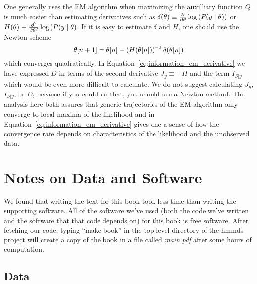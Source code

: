 One generally uses the EM algorithm when maximizing the auxilliary
function $Q$ is much easier than estimating derivatives such as
$\delta(\theta) \equiv \frac{\partial}{\partial \theta} \log
\left( P(y \mid \theta )\right)$ or
$H(\theta) \equiv \frac{\partial^2}{\partial \theta^2} \log
\left( P(y \mid \theta \right)$.  If it is easy to estimate
$\delta$ and $H$, one should use the Newton scheme
\begin{equation*}
  {\theta}{[n+1]} = {\theta}{[n]} - \left(H({\theta}{[n]})\right)^{-1} \delta({\theta}{[n]})
\end{equation*}
which converges quadratically.  In
Equation~\eqref{eq:information_em_derivative} we have expressed $D$ in
terms of the second derivative $J_y\equiv -H$ and the term $I_{S|y}$
which would be even more difficult to calculate.  We do not suggest
calculating $J_y$, $I_{S|y}$, or $D$, because if you could do that,
you should use a Newton method.  The analysis here both assures that
generic trajectories of the EM algorithm only converge to local maxima
of the likelihood and in Equation~\eqref{eq:information_em_derivative}
gives one a sense of how the convergence rate depends on
characteristics of the likelihood and the unobserved data.

\chapter{Notes on Data and Software}
\label{cha:Software}

We found that writing the text for this book took less time than
writing the supporting software.  All of the software we've used (both
the code we've written and the software that that code depends on) for
this book is free software.  After fetching our code, typing ``make
book'' in the top level directory of the hmmds project will create a
copy of the book in a file called \emph{main.pdf} after some hours of
computation.  

\section*{Data}


